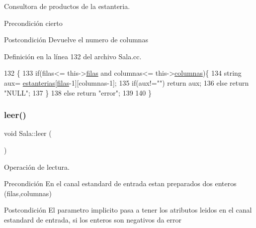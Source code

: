 Consultora de productos de la estanteria. 

\begin{DoxyPrecond}{Precondición}
cierto 
\end{DoxyPrecond}
\begin{DoxyPostcond}{Postcondición}
Devuelve el numero de columnas 
\end{DoxyPostcond}


Definición en la línea 132 del archivo Sala.\+cc.


\begin{DoxyCode}
132                                                       \{
133     \textcolor{keywordflow}{if}(filas<= this->\hyperlink{class_sala_a4cccb03763eea3ebd6d192491b25f7dc}{filas} and columnas<= this->\hyperlink{class_sala_af3c278931f26e28e77fa363e9be82000}{columnas})\{
134         \textcolor{keywordtype}{string} aux= \hyperlink{class_sala_a88aae17b7e590770fe8115b41da2e26a}{estanterias}[\hyperlink{class_sala_a4cccb03763eea3ebd6d192491b25f7dc}{filas}-1][columnas-1];
135         \textcolor{keywordflow}{if}(aux!=\textcolor{stringliteral}{""}) \textcolor{keywordflow}{return} aux;
136         \textcolor{keywordflow}{else} \textcolor{keywordflow}{return} \textcolor{stringliteral}{"NULL"};
137     \} 
138     \textcolor{keywordflow}{else} \textcolor{keywordflow}{return} \textcolor{stringliteral}{"error"};
139     
140 \}
\end{DoxyCode}
\mbox{\label{class_sala_abbb0194559de617baeed1e4b444ed2b2}} 
\subsubsection{\texorpdfstring{leer()}{leer()}}
{\footnotesize\ttfamily void Sala\+::leer (\begin{DoxyParamCaption}{ }\end{DoxyParamCaption})}



Operación de lectura. 

\begin{DoxyPrecond}{Precondición}
En el canal estandard de entrada estan preparados dos enteros (filas,columnas) 
\end{DoxyPrecond}
\begin{DoxyPostcond}{Postcondición}
El parametro implicito pasa a tener los atributos leidos en el canal estandard de entrada, si los enteros son negativos da error 
\end{DoxyPostcond}


